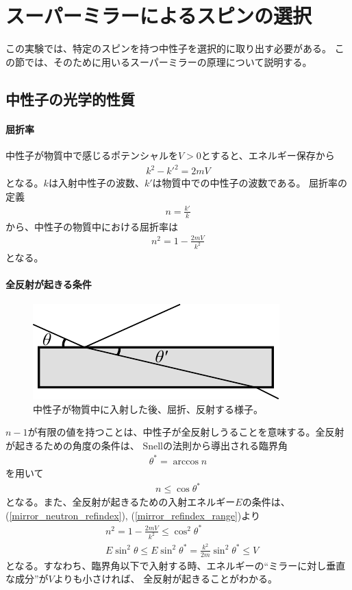 \section{スーパーミラーによるスピンの選択}
\nocite{neutron_spin_optics}
この実験では、特定のスピンを持つ中性子を選択的に取り出す必要がある。
この節では、そのために用いるスーパーミラーの原理について説明する。

\subsection{中性子の光学的性質}
\paragraph{屈折率}
中性子が物質中で感じるポテンシャルを$V>0$とすると、エネルギー保存から
\begin{align}
k^2-k'^2=2mV
\end{align}
となる。$k$は入射中性子の波数、$k'$は物質中での中性子の波数である。
屈折率の定義
\begin{align}
n=\frac{k'}{k}
\end{align}
から、中性子の物質中における屈折率は
\begin{align}
n^2=1-\frac{2mV}{k^2}\label{mirror_neutron_refindex}
\end{align}
となる。

\paragraph{全反射が起きる条件}\label{mirrir_perfect_reflection}
\begin{figure}[h]
\centering
\includegraphics{mirror/reflect.pdf}
\caption{中性子が物質中に入射した後、屈折、反射する様子。}
\end{figure}
$n-1$が有限の値を持つことは、中性子が全反射しうることを意味する。全反射が起きるための角度の条件は、
Snellの法則から導出される臨界角
\begin{align}
\theta^*=\arccos{n}
\end{align}
を用いて
\begin{align}
n\leq\cos\theta^* \label{mirror_refindex_range}
\end{align}
となる。また、全反射が起きるための入射エネルギー$E$の条件は、(\ref{mirror_neutron_refindex}), (\ref{mirror_refindex_range})より
\begin{align}
&n^2=1-\frac{2mV}{k^2}\leq\cos^2\theta^*\\
&E\sin^2\theta\leq E\sin^2\theta^*=\frac{k^2}{2m}\sin^2\theta^*\leq V\label{total_reflection_condition}
\end{align}
となる。すなわち、臨界角以下で入射する時、エネルギーの``ミラーに対し垂直な成分''が$V$よりも小さければ、
全反射が起きることがわかる。

